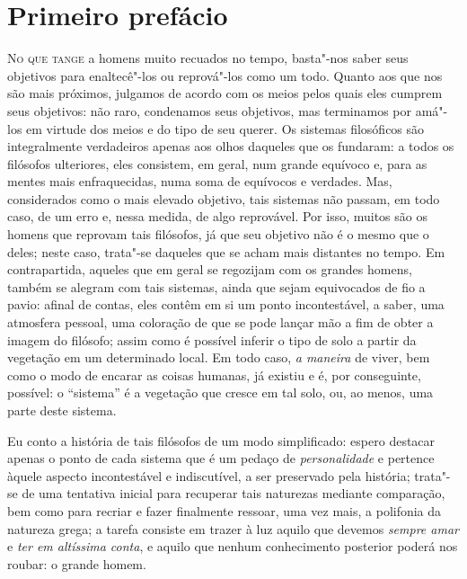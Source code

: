 \chapter{Primeiro prefácio}

\textsc{No que tange} a homens muito recuados no tempo, basta"-nos saber
seus objetivos para enaltecê"-los ou reprová"-los como um todo. Quanto
aos que nos são mais próximos, julgamos de acordo com os meios pelos
quais eles cumprem seus objetivos: não raro, condenamos seus objetivos,
mas terminamos por amá"-los em virtude dos meios e do tipo de seu
querer. Os sistemas filosóficos são integralmente verdadeiros apenas
aos olhos daqueles que os fundaram: a todos os filósofos ulteriores,
eles consistem, em geral, num grande equívoco e, para as mentes mais
enfraquecidas, numa soma de equívocos e verdades. Mas, considerados
como o mais elevado objetivo, tais sistemas não passam, em todo caso,
de um erro e, nessa medida, de algo reprovável. Por isso, muitos são
os homens que reprovam tais filósofos, já que seu objetivo não é o
mesmo que o deles; neste caso, trata"-se daqueles que se acham mais
distantes no tempo. Em contrapartida, aqueles que em geral se regozijam
com os grandes homens, também se alegram com tais sistemas, ainda que
sejam equivocados de fio a pavio: afinal de contas, eles contêm em si
um ponto incontestável, a saber, uma atmosfera pessoal, uma coloração \label{atmosferapessoal}
de que se pode lançar mão a fim de obter a imagem do filósofo; assim como
é possível inferir o tipo de solo a partir da vegetação em um determinado local. \label{possivelinferir}
Em todo caso, \textit{a maneira} de viver, bem como o modo de encarar as coisas \label{amaneirade}
humanas, já existiu e é, por conseguinte, possível: o ``sistema'' é a
vegetação que cresce em tal solo, ou, ao menos, uma parte deste sistema. 

Eu conto a história de tais filósofos de um modo simplificado: espero destacar \label{simplificado}
apenas o ponto de cada sistema que é um pedaço de
\textit{personalidade} e pertence àquele aspecto incontestável e
indiscutível, a ser preservado pela história; trata"-se de
uma tentativa inicial para recuperar tais naturezas mediante \label{comparacao}
comparação, bem como para recriar e fazer finalmente ressoar, uma vez
mais, a polifonia da natureza grega; a tarefa consiste em trazer à luz
aquilo que devemos \textit{sempre amar} e \textit{ter em altíssima conta}, 
e aquilo que nenhum conhecimento posterior poderá nos roubar: o \label{ograndehomem}
grande homem.


